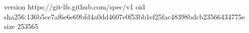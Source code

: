 version https://git-lfs.github.com/spec/v1
oid sha256:136b5ce7af6e6e69bfd4a0dd4607e0f53bb1ef25fac48398bdcb23566434775e
size 253565
